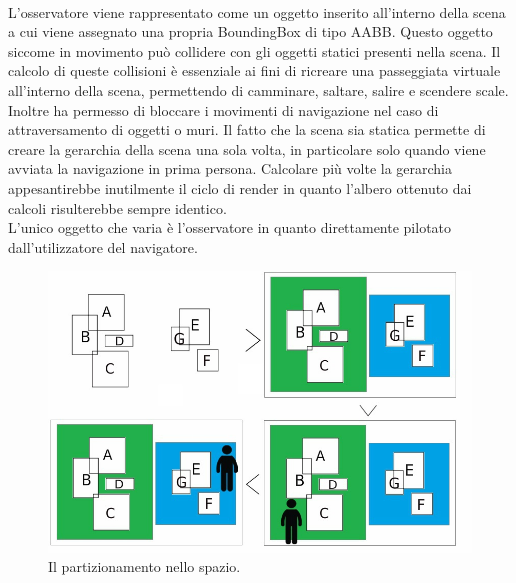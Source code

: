 \\
L’osservatore viene rappresentato come un oggetto inserito all’interno della scena a cui viene assegnato una propria BoundingBox di tipo AABB. 
Questo oggetto siccome in movimento può collidere con gli oggetti statici presenti nella scena.
Il calcolo di queste collisioni è essenziale ai fini di ricreare una passeggiata virtuale all’interno della scena, permettendo di camminare, saltare, salire e scendere scale. 
\\
Inoltre ha permesso di bloccare i movimenti di navigazione nel caso di attraversamento di oggetti o muri.
Il fatto che la scena sia statica permette di creare la gerarchia della scena una sola volta, in particolare solo quando viene avviata la navigazione in prima persona.
Calcolare più volte la gerarchia appesantirebbe inutilmente il ciclo di render in quanto l’albero ottenuto dai calcoli risulterebbe sempre identico.
\\
L’unico oggetto che varia è l’osservatore in quanto direttamente pilotato dall’utilizzatore del navigatore.

\begin{figure}[htb]
 \centering
 \includegraphics[width=1\linewidth]{images/chapter_navigazione_scena/partiz_oss.jpg}\hfill
 \caption[Il partizionamento nello spazio.]{Il partizionamento nello spazio.}
 \label{fig:navigazione_scena_partiz_oss}
\end{figure}

